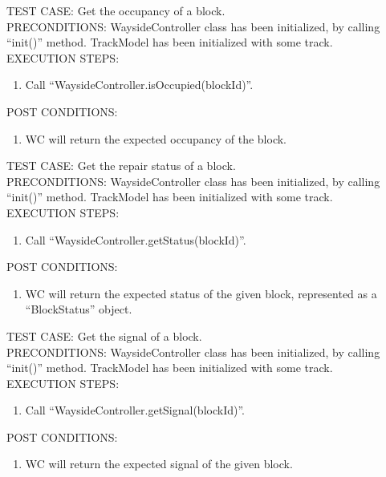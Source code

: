 \documentclass{scrreprt}
\begin{document}

        TEST CASE: Get the occupancy of a block.\\
        PRECONDITIONS: WaysideController class has been initialized, by calling ``init()'' method.
            TrackModel has been initialized with some track.\\
        EXECUTION STEPS: \begin{enumerate}
            \item Call ``WaysideController.isOccupied(blockId)''.
        \end{enumerate}
        POST CONDITIONS: \begin{enumerate}
            \item WC will return the expected occupancy of the block.
        \end{enumerate}

        TEST CASE: Get the repair status of a block.\\
        PRECONDITIONS: WaysideController class has been initialized, by calling ``init()'' method.
        TrackModel has been initialized with some track.\\
        EXECUTION STEPS: \begin{enumerate}
            \item Call ``WaysideController.getStatus(blockId)''.
        \end{enumerate}
        POST CONDITIONS: \begin{enumerate}
            \item WC will return the expected status of the given block, represented as a ``BlockStatus'' object.
        \end{enumerate}

        TEST CASE: Get the signal of a block.\\
        PRECONDITIONS: WaysideController class has been initialized, by calling ``init()'' method.
        TrackModel has been initialized with some track.\\
        EXECUTION STEPS: \begin{enumerate}
            \item Call ``WaysideController.getSignal(blockId)''.
        \end{enumerate}
        POST CONDITIONS: \begin{enumerate}
            \item WC will return the expected signal of the given block.
        \end{enumerate}
\end{document}
